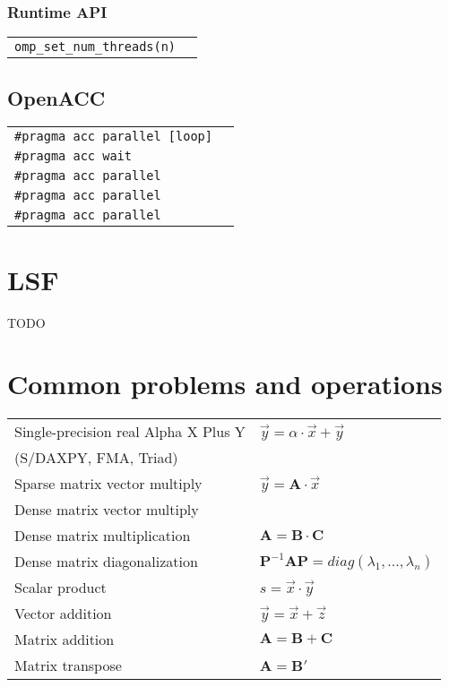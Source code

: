 \documentclass[11pt]{article}
\begin{document}
\subsubsection{Runtime API}

\begin{tabular}{ p{7cm} l }
	\lstinline$omp_set_num_threads(n)$ & \\
\end{tabular}

\subsection{OpenACC}

\begin{tabular}{ p{7cm} l }
	\lstinline$#pragma acc parallel [loop]$ & \\
	\lstinline$#pragma acc wait$ & \\
	\lstinline$#pragma acc parallel$ & \\
	\lstinline$#pragma acc parallel$ & \\
	\lstinline$#pragma acc parallel$ & \\
\end{tabular}

\section{LSF}

TODO

\section{Common problems and operations}

\begin{tabular}{ p{7cm} l }
	Single-precision real Alpha X Plus Y & \( \vec{y} = \alpha \cdot \vec{x} + \vec{y} \) \\
	(S/DAXPY, FMA, Triad) & \\
	Sparse matrix vector multiply & \( \vec{y} = \mathbf{A} \cdot \vec{x} \) \\
	Dense matrix vector multiply & \\
	Dense matrix multiplication & \( \mathbf{A} = \mathbf{B} \cdot \mathbf{C} \) \\
	Dense matrix diagonalization & \( \mathbf{P}^{-1} \mathbf{A} \mathbf{P} = diag(\lambda_1, ..., \lambda_n) \) \\
	Scalar product & \( s = \vec{x} \cdot \vec{y} \) \\
	Vector addition & \( \vec{y} = \vec{x} + \vec{z} \) \\
	Matrix addition & \( \mathbf{A} = \mathbf{B} + \mathbf{C} \) \\
	Matrix transpose & \( \mathbf{A} = \mathbf{B}' \) \\
\end{tabular}
\end{document}
